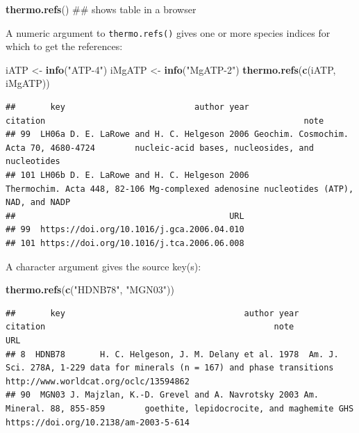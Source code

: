 \documentclass[]{tufte-book}
\newenvironment{Shaded}{}{}
\newcommand{\KeywordTok}[1]{\textcolor[rgb]{0.00,0.44,0.13}{\textbf{#1}}}
\newcommand{\StringTok}[1]{\textcolor[rgb]{0.25,0.44,0.63}{#1}}
\newcommand{\NormalTok}[1]{#1}
\begin{document}
\begin{Shaded}
\begin{Highlighting}[]
\KeywordTok{thermo.refs}\NormalTok{()  ## shows table in a browser}
\end{Highlighting}
\end{Shaded}

A numeric argument to {\texttt{thermo.refs()}} gives one or more species
indices for which to get the references:

\begin{Shaded}
\begin{Highlighting}[]
\NormalTok{iATP <-}\StringTok{ }\KeywordTok{info}\NormalTok{(}\StringTok{"ATP-4"}\NormalTok{)}
\NormalTok{iMgATP <-}\StringTok{ }\KeywordTok{info}\NormalTok{(}\StringTok{"MgATP-2"}\NormalTok{)}
\KeywordTok{thermo.refs}\NormalTok{(}\KeywordTok{c}\NormalTok{(iATP, iMgATP))}
\end{Highlighting}
\end{Shaded}

\begin{verbatim}
##       key                          author year                               citation                                                    note
## 99  LH06a D. E. LaRowe and H. C. Helgeson 2006 Geochim. Cosmochim. Acta 70, 4680-4724        nucleic-acid bases, nucleosides, and nucleotides
## 101 LH06b D. E. LaRowe and H. C. Helgeson 2006           Thermochim. Acta 448, 82-106 Mg-complexed adenosine nucleotides (ATP), NAD, and NADP
##                                           URL
## 99  https://doi.org/10.1016/j.gca.2006.04.010
## 101 https://doi.org/10.1016/j.tca.2006.06.008
\end{verbatim}

A character argument gives the source key(s):

\begin{Shaded}
\begin{Highlighting}[]
\KeywordTok{thermo.refs}\NormalTok{(}\KeywordTok{c}\NormalTok{(}\StringTok{"HDNB78"}\NormalTok{, }\StringTok{"MGN03"}\NormalTok{))}
\end{Highlighting}
\end{Shaded}

\begin{verbatim}
##       key                                    author year                 citation                                              note                                   URL
## 8  HDNB78       H. C. Helgeson, J. M. Delany et al. 1978  Am. J. Sci. 278A, 1-229 data for minerals (n = 167) and phase transitions http://www.worldcat.org/oclc/13594862
## 90  MGN03 J. Majzlan, K.-D. Grevel and A. Navrotsky 2003 Am. Mineral. 88, 855-859        goethite, lepidocrocite, and maghemite GHS https://doi.org/10.2138/am-2003-5-614
\end{verbatim}
\end{document}
